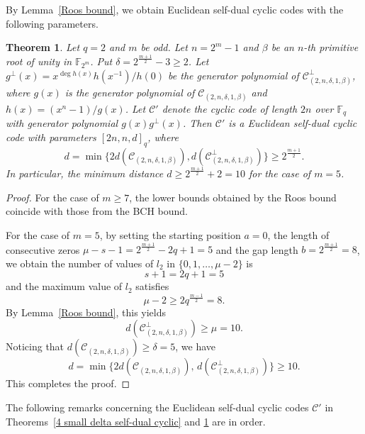\documentclass[10pt,a4paper]{amsart}
\newtheorem{theorem}{Theorem}
\begin{document}
By Lemma~\ref{Roos bound}, we obtain Euclidean self-dual cyclic codes with the following parameters.

\begin{theorem}
    \label{2 small delta self-dual cyclic}
    Let $q=2$ and $m$ be odd. Let $n=2^m-1$ and $\beta$ be an $n$-th primitive root of unity in $\mathbb{F}_{2^m}$. Put $\delta=2^{\frac{m+1}{2}}-3\ge2$. Let $g^\perp(x)=x^{\deg h(x)}h(x^{-1})/h(0)$ be the generator polynomial of $\mathcal{C}_{(2,n,\delta,1,\beta)}^\perp$, where $g(x)$ is the generator polynomial of $\mathcal{C}_{(2,n,\delta,1,\beta)}$ and $h(x)=(x^n-1)/g(x)$. Let $\mathcal{C}'$ denote the cyclic code of length $2n$ over $\mathbb{F}_q$ with generator polynomial $g(x)g^\perp(x)$. Then $\mathcal{C}'$ is a Euclidean self-dual cyclic code with parameters $[2n,n,d]_q$, where \[d=\min\{2d(\mathcal{C}_{(2,n,\delta,1,\beta)}),d(\mathcal{C}_{(2,n,\delta,1,\beta)}^\perp)\}\ge2^\frac{m+1}{2}.\]
    In particular, the minimum distance $d\ge 2^\frac{m+1}{2}+2=10$ for the case of $m=5$.
\end{theorem}

\begin{proof}
    For the case of $m \ge 7$, the lower bounds obtained by the Roos bound coincide with those from the BCH bound.

For the case of $m = 5$, by setting the starting position $a = 0$, the length of consecutive zeros $\mu - s - 1 = 2^{\frac{m+1}{2}} - 2q + 1 = 5$ and the gap length $b = 2^{\frac{m+1}{2}} = 8$, we obtain the number of values of $l_2$ in $\{0,1,\dots,\mu-2\}$ is
\[
s + 1 = 2q + 1 = 5
\]
and the maximum value of $l_2$ satisfies
\[
\mu - 2 \ge 2q^{\frac{m-1}{2}} = 8.
\]
By Lemma~\ref{Roos bound}, this yields
\[
d(\mathcal{C}^\perp_{(2,n,\delta,1,\beta)}) \ge \mu = 10.
\]
Noticing that $d(\mathcal{C}_{(2,n,\delta,1,\beta)}) \ge \delta = 5$, we have
\[
d = \min\{2d(\mathcal{C}_{(2,n,\delta,1,\beta)}),\, d(\mathcal{C}^\perp_{(2,n,\delta,1,\beta)})\} \ge 10.
\]
This completes the proof.
\end{proof}

The following remarks concerning the Euclidean self-dual cyclic codes $\mathcal{C}'$ in Theorems~\ref{4 small delta self-dual cyclic} and \ref{2 small delta self-dual cyclic} are in order.
\end{document}
